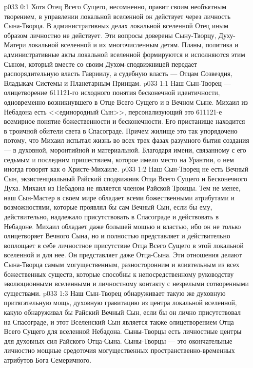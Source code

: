 \vs p033 0:1 Хотя Отец Всего Сущего, несомненно, правит своим необъятным творением, в управлении локальной вселенной он действует через личность Сына\hyp{}Творца. В административных делах локальной вселенной Отец иным образом личностно не действует. Эти вопросы доверены Сыну\hyp{}Творцу, Духу\hyp{}Матери локальной вселенной и их многочисленным детям. Планы, политика и административные акты локальной вселенной формируются и исполняются этим Сыном, который вместе со своим Духом\hyp{}сподвижницей передает распорядительную власть Гавриилу, а судебную власть --- Отцам Созвездия, Владыкам Системы и Планетарным Принцам.
\vs p033 1:1 Наш Сын\hyp{}Творец --- олицетворение 611121\hyp{}го исходного понятия бесконечной идентичности, одновременно возникнувшего в Отце Всего Сущего и в Вечном Сыне. Михаил из Небадона есть <<единородный Сын>>, персонализующий это 611121\hyp{}е всемирное понятие божественности и бесконечности. Его пристанище находится в троичной обители света в Спасограде. Причем жилище это так упорядочено потому, что Михаил испытал жизнь во всех трех фазах разумного бытия создания --- в духовной, моронтийной и материальной. Благодаря имени, связанному с его седьмым и последним пришествием, которое имело место на Урантии, о нем иногда говорят как о Христе\hyp{}Михаиле.
\vs p033 1:2 Наш Сын\hyp{}Творец не есть Вечный Сын, экзистенциальный Райский сподвижник Отца Всего Сущего и Бесконечного Духа. Михаил из Небадона не является членом Райской Троицы. Тем не менее, наш Сын\hyp{}Мастер в своем мире обладает всеми божественными атрибутами и возможностями, которые проявлял бы сам Вечный Сын, если бы ему, действительно, надлежало присутствовать в Спасограде и действовать в Небадоне. Михаил обладает даже большей мощью и властью, ибо он не только олицетворяет Вечного Сына, но и полностью представляет и действительно воплощает в себе личностное присутствие Отца Всего Сущего в этой локальной вселенной и для нее. Он представляет даже Отца\hyp{}Сына. Эти отношения делают Сына\hyp{}Творца самым могущественным, разносторонним и влиятельным из всех божественных существ, которые способны к непосредственному руководству эволюционными вселенными и личностному контакту с незрелыми сотворенными существами.
\vs p033 1:3 Наш Сын\hyp{}Творец обнаруживает такую же духовную притягательную мощь, духовную гравитацию из центра локальной вселенной, какую обнаруживал бы Райский Вечный Сын, если бы он лично присутствовал на Спасограде, и  этот Вселенский Сын является также олицетворением Отца Всего Сущего для вселенной Небадона. Сыны\hyp{}Творцы есть личностные центры для духовных сил Райского Отца\hyp{}Сына. Сыны\hyp{}Творцы --- это окончательные личностно мощные средоточия могущественных пространственно\hyp{}временных атрибутов Бога Семеричного.
